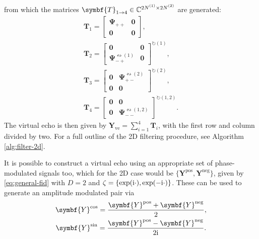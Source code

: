 from which the matrices $\symbf{T}_{1 \rightarrow 4} \in \mathbb{C}^{2 \None
\times 2 \Ntwo}$ are generated:
\begin{subequations}
    \begin{gather}
        \symbf{T}_1 =
        \begin{bmatrix}
            \symbf{\Psi}_{++} & \symbf{0} \\
            \symbf{0} & \symbf{0}
        \end{bmatrix}, \\
        \symbf{T}_2 =
        \begin{bmatrix}
            \symbf{0} & \symbf{0} \\
            \symbf{\Psi}_{-+}^{\leftrightsquigarrow (1)} & \symbf{0}
        \end{bmatrix}^{\circlearrowright (1)}, \\
        \symbf{T}_3 =
        \begin{bmatrix}
            \symbf{0} & \symbf{\Psi}_{+-}^{\leftrightsquigarrow (2)} \\
            \symbf{0} & \symbf{0}
        \end{bmatrix}^{\circlearrowright (2)}, \\
        \symbf{T}_4 =
        \begin{bmatrix}
            \symbf{0} & \symbf{0} \\
            \symbf{0} & \symbf{\Psi}_{--}^{\leftrightsquigarrow (1,2)}
        \end{bmatrix}^{\circlearrowright (1,2)}.
    \end{gather}
\end{subequations}
The virtual echo is then given by $\symbf{Y}_{\text{ve}} = \sum_{i=1}^4
\symbf{T}_i$, with the first row and column divided by two. For a full outline
of the 2D filtering procedure, see Algorithm \ref{alg:filter-2d}.

It is possible to construct a virtual echo using an appropriate set of
phase-modulated signals too, which for the \ac{2D} case would be $\lbrace
\symbf{Y}^{\text{pos}}, \symbf{Y}^{\text{neg}}\rbrace$, given by
\eqref{eq:general-fid} with $D=2$ and  $\zeta = \lbrace \exp(\mathrm{i} \cdot),
\exp(-\mathrm{i}\cdot)\rbrace$. These can be used to generate an amplitude modulated pair via
\begin{subequations}
    \begin{gather}
        \symbf{Y}^{\text{cos}} = \frac{\symbf{Y}^{\text{pos}} + \symbf{Y}^{\text{neg}}}{2},\\
        \symbf{Y}^{\text{sin}} = \frac{\symbf{Y}^{\text{pos}} - \symbf{Y}^{\text{neg}}}{2\iu}.
    \end{gather}
\end{subequations}



